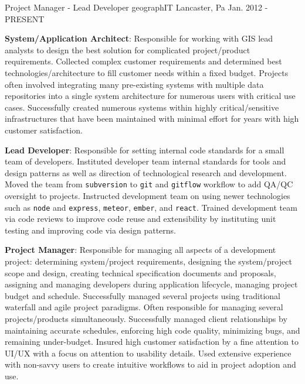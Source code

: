 \begin{cventries}
  \cventry
    {Project Manager - Lead Developer}
    {geographIT}
    {Lancaster, Pa}
    {Jan. 2012 - PRESENT}
    {
      \begin{cvitems}
        \item{\textbf{System/Application Architect}: Responsible for working with GIS lead analysts to design the best solution for complicated project/product requirements. Collected complex customer requirements and determined best technologies/architecture to fill customer needs within a fixed budget.  Projects often involved integrating many pre-existing systems with multiple data repositories into a single system architecture for numerous users with critical use cases. Successfully created numerous systems within highly critical/sensitive infrastructures that have been maintained with minimal effort for years with high customer satisfaction. }
        \bigskip
        \item{\textbf{Lead Developer}: Responsible for setting internal code standards for a small team of developers.  Instituted developer team internal standards for tools and design patterns as well as direction of technological research and development.  Moved the team from \texttt{subversion} to \texttt{git} and \texttt{gitflow} workflow to add QA/QC oversight to projects.  Instructed development team on using newer technologies such as \texttt{node} and \texttt{express}, \texttt{meteor}, \texttt{ember}, and \texttt{react}.  Trained development team via code reviews to improve code reuse and extensibility by instituting unit testing and improving code via design patterns. }
        \bigskip
        \item{\textbf{Project Manager}: Responsible for managing all aspects of a development project: determining system/project requirements, designing the system/project scope and design, creating technical specification documents and proposals, assigning and managing developers during application lifecycle, managing project budget and schedule.  Successfully managed several projects using traditional waterfall and agile project paradigms.  Often responsible for managing several projects/products simultaneously.  Successfully managed client relationships by maintaining accurate schedules, enforcing high code quality, minimizing bugs, and remaining under-budget. Insured high customer satisfaction by a fine attention to UI/UX with a focus on attention to usability details.  Used extensive experience with non-savvy users to create intuitive workflows to aid in project adoption and use. }

\end{cvitems}}
\end{cventries}

